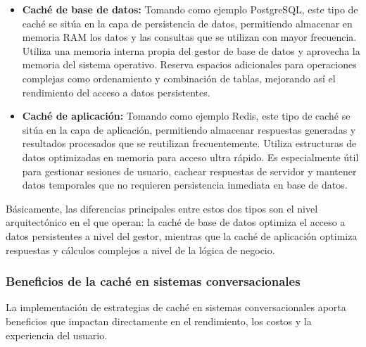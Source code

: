 \begin{itemize}
    \item \textbf{Caché de base de datos:} Tomando como ejemplo PostgreSQL, este tipo de caché se sitúa en la capa de persistencia de datos, permitiendo almacenar en memoria RAM los datos y las consultas que se utilizan con mayor frecuencia. Utiliza una memoria interna propia del gestor de base de datos y aprovecha la memoria del sistema operativo. Reserva espacios adicionales para operaciones complejas como ordenamiento y combinación de tablas, mejorando así el rendimiento del acceso a datos persistentes. \cite{heroku2026postgres}
    \item \textbf{Caché de aplicación:} Tomando como ejemplo Redis, este tipo de caché se sitúa en la capa de aplicación, permitiendo almacenar respuestas generadas y resultados procesados que se reutilizan frecuentemente. Utiliza estructuras de datos optimizadas en memoria para acceso ultra rápido. Es especialmente útil para gestionar sesiones de usuario, cachear respuestas de servidor y mantener datos temporales que no requieren persistencia inmediata en base de datos. \cite{redis2025whatis}
\end{itemize}

Básicamente, las diferencias principales entre estos dos tipos son el nivel arquitectónico en el que operan: la caché de base de datos optimiza el acceso a datos persistentes a nivel del gestor, mientras que la caché de aplicación optimiza respuestas y cálculos complejos a nivel de la lógica de negocio.

\subsubsection{Beneficios de la caché en sistemas conversacionales}
\label{subsec:beneficios_cache}

La implementación de estrategias de caché en sistemas conversacionales aporta beneficios que impactan directamente en el rendimiento, los costos y la experiencia del usuario.

